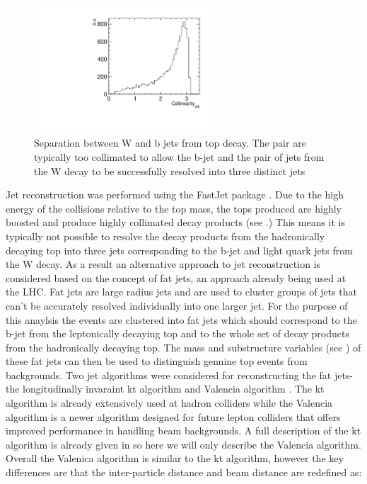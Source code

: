 \begin{figure}
  \centering
  \includegraphics[width=0.6\textwidth]{TopAnalysis/figures/WBCollinearity}
  \caption[Separation between W and b jet from top decay]{Separation between W and b jets from top decay. The pair are typically too collimated to allow the b-jet and the pair of jets from the W decay to be successfully resolved into three distinct jets}
  \label{fig:Collimated}
\end{figure}

Jet reconstruction was performed using the FastJet package \cite{Cacciari:2011ma}. Due to the high energy of the collisions relative to the top mass, the tops produced are highly boosted and produce highly collimated decay products (see .) This means it is typically not possible to resolve the decay products from the hadronically decaying top into three jets corresponding to the b-jet and light quark jets from the W decay. As a result an alternative approach to jet reconstruction is considered based on the concept of fat jets, an approach already being used at the LHC\cite{Miller:2011qg}. Fat jets are large radius jets and are used to cluster groups of jets that can't be accurately resolved individually into one larger jet. For the purpose of this anaylsis the events are clustered into fat jets which should correspond to the b-jet from the leptonically decaying top and to the whole set of decay products from the hadronically decaying top. The mass and substructure variables (see ) of these fat jets can then be used to distinguish genuine top events from backgrounds. Two jet algorithms were considered for reconstructing the fat jets- the longitudinally invaraint kt algorithm \cite{Cacciari:2008gp} and Valencia algorithm \cite{Boronat:2014hva}. The kt algorithm is already extensively used at hadron colliders while the Valencia algorithm is a newer algorithm designed for future lepton colliders that offers improved performance in handling beam backgrounds. A full description of the kt algorithm is already given in  so here we will only describe the Valencia algorithm. Overall the Valenica algorithm is similar to the kt algorithm, however the key differences are that the inter-particle distance and beam distance are redefined as:

